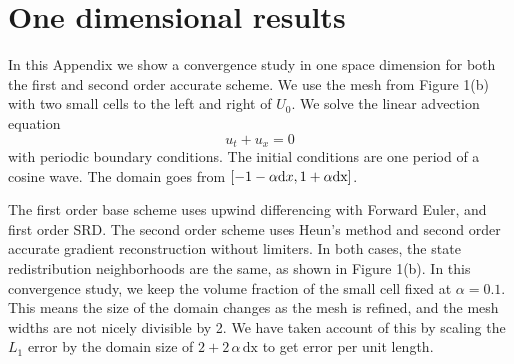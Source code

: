 \appendix
\section{One dimensional results}\label{sec:theory}

In this Appendix we show a convergence study in one space dimension
for both the first and second order accurate scheme.
We use the mesh from Figure 1(b) with two small cells
to the left and right of $U_0$. 
We solve the linear advection equation
\begin{equation}
u_t +  u_x = 0
\end{equation}
with periodic boundary conditions. 
The initial conditions are  one period of a cosine
wave. The domain goes from $[-1-\alpha {\textrm dx}, 1+\alpha \textrm{dx}]$.

The first order base scheme uses upwind differencing with Forward Euler,
and first order SRD. The second order scheme uses Heun's
method and second order accurate 
gradient reconstruction without limiters. 
In both cases, the state redistribution neighborhoods are the same, as shown in
Figure 1(b).
In this convergence study, we keep the volume fraction  of the small cell 
fixed at $\alpha=0.1$. This means the size of the domain changes as the mesh is
refined, and the mesh widths are not nicely divisible by 2.  We have taken 
account of this by scaling the $L_1$ error by the domain size 
of $2+2 \, \alpha \, \textrm{dx}$ to get error per unit length.

